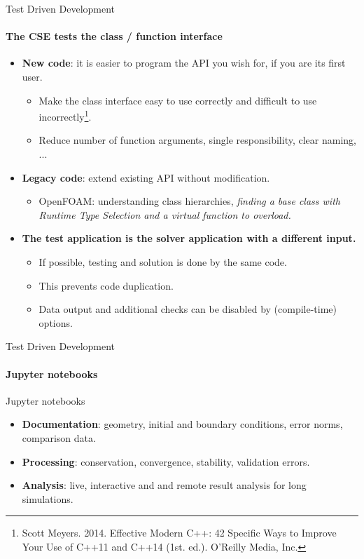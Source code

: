 \documentclass[
	ngerman,%
	aspectratio=169,%
	color={accentcolor=2d},
	logo=true,%
	colorframetitle=true,%
	]{tudabeamer}
\begin{document}
\begin{frame}{Test Driven Development} 
    \framesubtitle{The CSE tests the class / function interface}
        \vfill

    \begin{itemize}
        \item \textbf{New code}: it is easier to program the API you wish for, if you are its first user. 
            \begin{itemize}
                \item Make the class interface easy to use correctly and difficult to use incorrectly\footnote{Scott Meyers. 2014. Effective Modern C++: 42 Specific Ways to Improve Your Use of C++11 and C++14 (1st. ed.). O'Reilly Media, Inc.}.
                \item Reduce number of function arguments, single responsibility, clear naming, ... 
            \end{itemize}
        \item \textbf{Legacy code}: extend existing API without modification. 
            \begin{itemize}
                \item OpenFOAM: understanding class hierarchies, \textit{finding a base class with Runtime Type Selection and a virtual function to overload.}
            \end{itemize}
        \item \textbf{The test application is the solver application with a different input.}
            \begin{itemize}
                \item If possible, testing and solution is done by the same code.  
                \item This prevents code duplication. 
                \item Data output and additional checks can be disabled by (compile-time) options.
            \end{itemize}
    \end{itemize}

\end{frame}


\begin{frame}{Test Driven Development} 
    \framesubtitle{Jupyter notebooks}

    \vfill
    Jupyter notebooks 
    \begin{itemize}
        \item \textbf{Documentation}: geometry, initial and boundary conditions, error norms, comparison data.
        \item \textbf{Processing}: conservation, convergence, stability, validation errors. 
        \item \textbf{Analysis}: live, interactive and and remote result analysis for long simulations.
    \end{itemize}
\end{frame}
\end{document}
